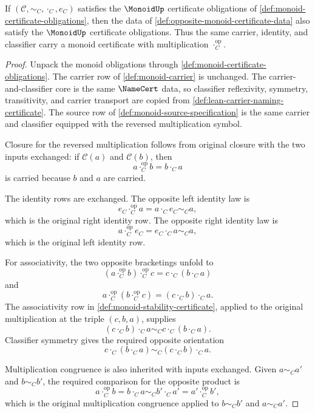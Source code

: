 \begin{theorem}
\label{thm:opposite-monoid-certificate}
If $(\mathcal C,\sim_C,\cdot_C,e_C)$ satisfies the $\MonoidUp$ certificate obligations of \autoref{def:monoid-certificate-obligations}, then the data of \autoref{def:opposite-monoid-certificate-data} also satisfy the $\MonoidUp$ certificate obligations. Thus the same carrier, identity, and classifier carry a monoid certificate with multiplication $\cdot_C^{\mathrm{op}}$.
\end{theorem}
\begin{proof}
Unpack the monoid obligations through \autoref{def:monoid-certificate-obligations}. The carrier row of \autoref{def:monoid-carrier} is unchanged. The carrier-and-classifier core is the same $\NameCert$ data, so classifier reflexivity, symmetry, transitivity, and carrier transport are copied from \autoref{def:lean-carrier-naming-certificate}. The source row of \autoref{def:monoid-source-specification} is the same carrier and classifier equipped with the reversed multiplication symbol.

Closure for the reversed multiplication follows from original closure with the two inputs exchanged: if $\mathcal C(a)$ and $\mathcal C(b)$, then
$$
a\cdot_C^{\mathrm{op}} b=b\cdot_C a
$$
is carried because $b$ and $a$ are carried.

The identity rows are exchanged. The opposite left identity law is
$$
e_C\cdot_C^{\mathrm{op}} a=a\cdot_C e_C\sim_C a,
$$
which is the original right identity row. The opposite right identity law is
$$
a\cdot_C^{\mathrm{op}} e_C=e_C\cdot_C a\sim_C a,
$$
which is the original left identity row.

For associativity, the two opposite bracketings unfold to
$$
(a\cdot_C^{\mathrm{op}} b)\cdot_C^{\mathrm{op}} c=c\cdot_C(b\cdot_C a)
$$
and
$$
a\cdot_C^{\mathrm{op}}(b\cdot_C^{\mathrm{op}} c)=(c\cdot_C b)\cdot_C a.
$$
The associativity row in \autoref{def:monoid-stability-certificate}, applied to the original multiplication at the triple $(c,b,a)$, supplies
$$
(c\cdot_C b)\cdot_C a\sim_C c\cdot_C(b\cdot_C a).
$$
Classifier symmetry gives the required opposite orientation
$$
c\cdot_C(b\cdot_C a)\sim_C(c\cdot_C b)\cdot_C a.
$$

Multiplication congruence is also inherited with inputs exchanged. Given $a\sim_C a'$ and $b\sim_C b'$, the required comparison for the opposite product is
$$
a\cdot_C^{\mathrm{op}} b=b\cdot_C a\sim_C b'\cdot_C a'=a'\cdot_C^{\mathrm{op}} b',
$$
which is the original multiplication congruence applied to $b\sim_C b'$ and $a\sim_C a'$.


\end{proof}
